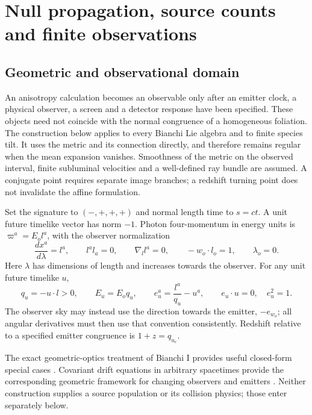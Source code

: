 \chapter{Null propagation, source counts and finite observations}
\label{vii:chapter}

\section{Geometric and observational domain}
An anisotropy calculation becomes an observable only after an emitter clock, a physical observer, a screen and a detector response have been specified. These objects need not coincide with the normal congruence of a homogeneous foliation. The construction below applies to every Bianchi Lie algebra and to finite species tilt. It uses the metric and its connection directly, and therefore remains regular when the mean expansion vanishes. Smoothness of the metric on the observed interval, finite subluminal velocities and a well-defined ray bundle are assumed. A conjugate point requires separate image branches; a redshift turning point does not invalidate the affine formulation.

Set the signature to $(-,+,+,+)$ and normal length time to $s=ct$. A unit future timelike vector has norm $-1$. Photon four-momentum in energy units is $\varpi^a=E_o l^a$, with the observer normalization
\begin{equation}\label{vii:normalisation}
\frac{dx^a}{d\lambda}=l^a,\qquad l^al_a=0,\qquad
\nabla_l l^a=0,\qquad -w_o\cdot l_o=1,\qquad \lambda_o=0.
\end{equation}
Here $\lambda$ has dimensions of length and increases towards the observer. For any unit future timelike $u$,
\begin{equation}\label{vii:energy_direction}
q_u=-u\cdot l>0,\qquad E_u=E_o q_u,\qquad
e_u^a=\frac{l^a}{q_u}-u^a,\qquad e_u\cdot u=0,\quad e_u^2=1.
\end{equation}
The observer sky may instead use the direction towards the emitter, $-e_{w_o}$; all angular derivatives must then use that convention consistently. Redshift relative to a specified emitter congruence is $1+z=q_{u_e}$.

The exact geometric-optics treatment of Bianchi I provides useful closed-form special cases \cite{Fleury2015}. Covariant drift equations in arbitrary spacetimes provide the corresponding geometric framework for changing observers and emitters \cite{KorzynskiKopinski2018}. Neither construction supplies a source population or its collision physics; those enter separately below.

